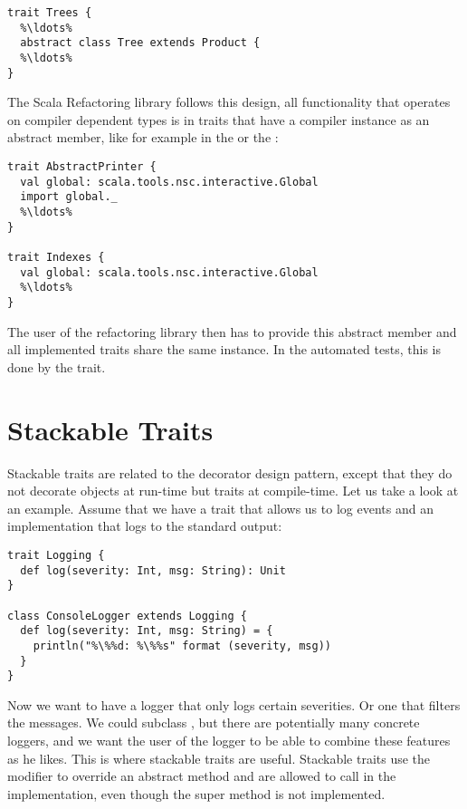 \begin{lstlisting}
trait Trees {
  %\ldots%
  abstract class Tree extends Product {
  %\ldots%
}
\end{lstlisting}

The Scala Refactoring library follows this design, all functionality that operates on compiler dependent types is in traits that have a compiler instance as an abstract member, like for example in the  or the :

\begin{lstlisting}
trait AbstractPrinter {
  val global: scala.tools.nsc.interactive.Global
  import global._
  %\ldots%
}

trait Indexes {
  val global: scala.tools.nsc.interactive.Global
  %\ldots%
}
\end{lstlisting}

The user of the refactoring library then has to provide this abstract member and all implemented traits share the same instance. In the automated tests, this is done by the  trait.

\section{Stackable Traits} \label{section:stackable-traits}

Stackable traits are related to the decorator design pattern, except that they do not decorate objects at run-time but traits at compile-time. Let us take a look at an example. Assume that we have a trait that allows us to log events and an implementation that logs to the standard output:

\begin{lstlisting}
trait Logging {
  def log(severity: Int, msg: String): Unit
}

class ConsoleLogger extends Logging {
  def log(severity: Int, msg: String) = {
    println("%\%%d: %\%%s" format (severity, msg))
  }
}
\end{lstlisting}

Now we want to have a logger that only logs certain severities. Or one that filters the messages. We could subclass , but there are potentially many concrete loggers, and we want the user of the logger to be able to combine these features as he likes. This is where stackable traits are useful. Stackable traits use the  modifier to override an abstract method and are allowed to call  in the implementation, even though the super method is not implemented.

